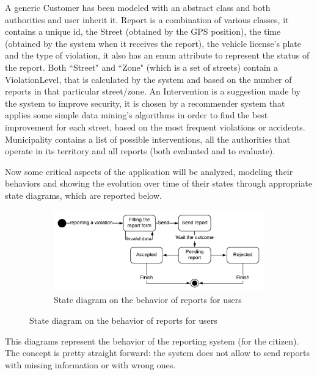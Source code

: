 \documentclass[12pt,a4paper]{report}
\begin{document}
		A generic Customer has been modeled with an abstract class and both authorities and user inherit it.
		Report is a combination of various classes, it contains a unique id, the Street (obtained by the GPS position), the time (obtained
		by the system when it receives the report), the vehicle license's plate and the type of violation, it also has an enum attribute
		to represent the status of the report. Both ``Street" and ``Zone" (which is a set of streets) contain a ViolationLevel, that
		is calculated by the system and based on the number of reports in that particular street/zone. An Intervention is a suggestion made
		by the system to improve security, it is chosen by a recommender system that applies some simple data mining's algorithms
		in order to find the best improvement for each street, based on the most frequent violations or accidents.
		Municipality contains a list of possible interventions, all the authorities that operate in its territory and all reports
		(both evaluated and to evaluate).

		Now some critical aspects of the application will be analyzed, modeling their behaviors and	
		showing the evolution over time of their	states through appropriate state diagrams, which are
		reported below.
		
		\begin{figure}[H]
			\begin{subfigure}{\textwidth}
				\includegraphics[scale = 0.75, center]{reportC}
				\caption{State diagram on the behavior of reports for users}
			\end{subfigure}
		\end{figure}
		This diagrams represent the behavior of the reporting system (for the citizen). The concept is pretty straight forward: the system does not allow to send reports
		with missing information or with wrong ones.
		
\end{document}
